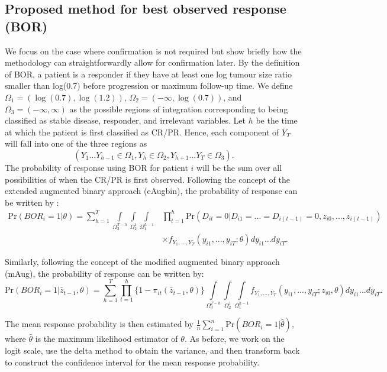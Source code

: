 \documentclass[10pt,A4]{article}
\begin{document}
\subsection{Proposed method for best observed response (BOR)}\label{BOR}
We focus on the case where confirmation is not required but show briefly how the methodology can straightforwardly allow for confirmation later. By the definition of BOR, a patient is a responder if they have at least one log tumour size ratio smaller than log(0.7) before progression or maximum follow-up time. We define $\Omega_1= (\log(0.7), \log(1.2))$, $\Omega_2 = (-\infty,\log(0.7))$, and $\Omega_3=(-\infty, \infty)$ as the possible regions of integration corresponding to being classified as stable disease, responder, and irrelevant variables. Let $h$ be the time at which the patient is first classified as CR/PR. Hence, each component of $\bar{Y}_T$ will fall into one of the three regions as
\begin{equation}
(Y_1 \ldots Y_{h-1} \in \Omega_1, Y_h \in \Omega_2, Y_{h+1} \ldots Y_T \in \Omega_3).
\label{BORy}
\end{equation}
The probability of response using BOR for patient $i$ will be the sum over all possibilities of when the CR/PR is first observed. Following the concept of the extended augmented binary approach (eAugbin), the probability of response can be written by :
\begin{equation}
\begin{array}{cl}
\text{Pr}(BOR_i=1|\theta)= \sum \limits_{h=1}^T \int\limits_{\Omega_3^{T-h}}\int\limits_{\Omega_2^1} \int\limits_{\Omega_1^{h-1}} &\prod\limits_{t=1}^{h}\text{Pr}(D_{it}=0|D_{i1}=\ldots=D_{i(t-1)}=0 , z_{i0},\ldots,z_{i(t-1)})\\
 & \times f_{Y_1,...,Y_T}(y_{i1},...,y_{iT};\theta)dy_{i1}...dy_{iT}.
  \end{array}
\end{equation}

Similarly, following the concept of the modified augmented binary approach (mAug), the probability of response can be written by:
\begin{equation}
\text{Pr}(BOR_i=1|\bar{z}_{t-1}, \theta)= \sum \limits_{h=1}^T\prod_{t=1}^h \{1-\pi_{it}(\bar{z}_{t-1}, \theta)\} \int\limits_{\Omega_3^{T-h}}\int\limits_{\Omega_2^1} \int\limits_{\Omega_1^{h-1}} f_{Y_1,...,Y_T}(y_{i1},...,y_{iT};z_{i0}, \theta)dy_{i1}...dy_{iT}.
\label{eqBOR}
\end{equation}

The mean response probability is then estimated by $\frac{1}{n}\sum_{i=1}^{n}\text{Pr}(BOR_i=1|\hat{\theta})$, where $\hat{\theta}$ is the maximum likelihood estimator of $\theta$. As before, we work on the logit scale, use the delta method to obtain the variance, and then transform back to construct the confidence interval for the mean response probability.
\end{document}
